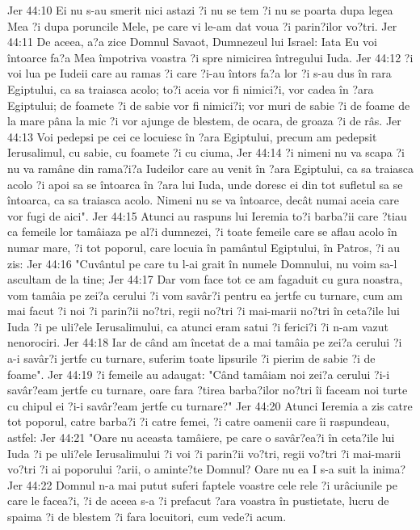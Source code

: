 Jer 44:10  Ei nu s-au smerit nici astazi ?i nu se tem ?i nu se poarta dupa legea Mea ?i dupa poruncile Mele, pe care vi le-am dat voua ?i parin?ilor vo?tri.
Jer 44:11  De aceea, a?a zice Domnul Savaot, Dumnezeul lui Israel: Iata Eu voi întoarce fa?a Mea împotriva voastra ?i spre nimicirea întregului Iuda.
Jer 44:12  ?i voi lua pe Iudeii care au ramas ?i care ?i-au întors fa?a lor ?i s-au dus în rara Egiptului, ca sa traiasca acolo; to?i aceia vor fi nimici?i, vor cadea în ?ara Egiptului; de foamete ?i de sabie vor fi nimici?i; vor muri de sabie ?i de foame de la mare pâna la mic ?i vor ajunge de blestem, de ocara, de groaza ?i de râs.
Jer 44:13  Voi pedepsi pe cei ce locuiesc în ?ara Egiptului, precum am pedepsit Ierusalimul, cu sabie, cu foamete ?i cu ciuma,
Jer 44:14  ?i nimeni nu va scapa ?i nu va ramâne din rama?i?a Iudeilor care au venit în ?ara Egiptului, ca sa traiasca acolo ?i apoi sa se întoarca în ?ara lui Iuda, unde doresc ei din tot sufletul sa se întoarca, ca sa traiasca acolo. Nimeni nu se va întoarce, decât numai aceia care vor fugi de aici".
Jer 44:15  Atunci au raspuns lui Ieremia to?i barba?ii care ?tiau ca femeile lor tamâiaza pe al?i dumnezei, ?i toate femeile care se aflau acolo în numar mare, ?i tot poporul, care locuia în pamântul Egiptului, în Patros, ?i au zis:
Jer 44:16  "Cuvântul pe care tu l-ai grait în numele Domnului, nu voim sa-l ascultam de la tine;
Jer 44:17  Dar vom face tot ce am fagaduit cu gura noastra, vom tamâia pe zei?a cerului ?i vom savâr?i pentru ea jertfe cu turnare, cum am mai facut ?i noi ?i parin?ii no?tri, regii no?tri ?i mai-marii no?tri în ceta?ile lui Iuda ?i pe uli?ele Ierusalimului, ca atunci eram satui ?i ferici?i ?i n-am vazut nenorociri.
Jer 44:18  Iar de când am încetat de a mai tamâia pe zei?a cerului ?i a-i savâr?i jertfe cu turnare, suferim toate lipsurile ?i pierim de sabie ?i de foame".
Jer 44:19  ?i femeile au adaugat: "Când tamâiam noi zei?a cerului ?i-i savâr?eam jertfe cu turnare, oare fara ?tirea barba?ilor no?tri îi faceam noi turte cu chipul ei ?i-i savâr?eam jertfe cu turnare?"
Jer 44:20  Atunci Ieremia a zis catre tot poporul, catre barba?i ?i catre femei, ?i catre oamenii care îi raspundeau, astfel:
Jer 44:21  "Oare nu aceasta tamâiere, pe care o savâr?ea?i în ceta?ile lui Iuda ?i pe uli?ele Ierusalimului ?i voi ?i parin?ii vo?tri, regii vo?tri ?i mai-marii vo?tri ?i ai poporului ?arii, o aminte?te Domnul? Oare nu ea I s-a suit la inima?
Jer 44:22  Domnul n-a mai putut suferi faptele voastre cele rele ?i urâciunile pe care le facea?i, ?i de aceea s-a ?i prefacut ?ara voastra în pustietate, lucru de spaima ?i de blestem ?i fara locuitori, cum vede?i acum.
